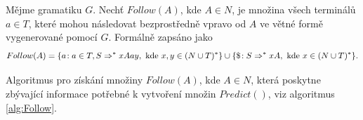 \begin{algorithm}
  \DontPrintSemicolon
  \SetAlgoNoLine
  \SetAlgoNoEnd

  \SetSideCommentLeft

  \BlankLine

  \SetNlSty{}{}{:}
  \SetNlSkip{-1.1em}

  \Indp\Indpp

  \BlankLine
  \BlankLine
  \BlankLine

  \caption{\textsc{$First(X_1 \dots X_n)$}} \label{alg:FirstRetezec}
\end{algorithm}

\begin{definice} \label{def:Follow}
  Mějme gramatiku $G$. Nechť $Follow(A)$, kde $A \in N$, je množina všech terminálů $a \in T$, které mohou následovat bezprostředně
  vpravo od $A$ ve větné formě vygenerované pomocí $G$. Formálně zapsáno jako
  $$Follow(A) = \{a\!: a \in T, S \Rightarrow^* xAay, \text{\ kde\ } \\ x, y \in (N \cup T)^*\} \cup
  \{\$\!: S \Rightarrow^* xA, \text{\ kde\ } x \in (N \cup T)^*\}.$$
\end{definice}

Algoritmus pro získání množiny $Follow(A)$, kde $A \in N$, která poskytne zbývající informace potřebné k vytvoření množin $Predict()$, viz algoritmus \ref{alg:Follow}.


